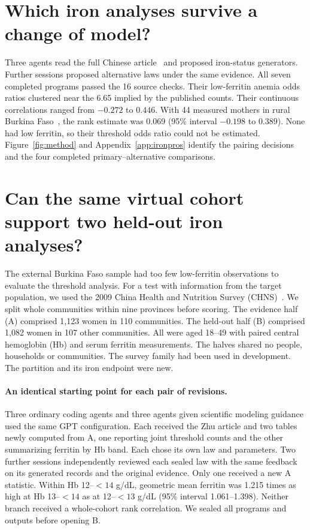 \documentclass[sigconf,anonymous,review]{acmart}
\begin{document}
\section{Which iron analyses survive a change of model?}
\label{sec:ironpros}
Three agents read the full Chinese article~\cite{zhu} and proposed iron-status generators. Further sessions proposed alternative laws under the same evidence. All seven completed programs passed the 16 source checks. Their low-ferritin anemia odds ratios clustered near the 6.65 implied by the published counts. Their continuous correlations ranged from $-0.272$ to $0.446$. With 44 measured mothers in rural Burkina Faso~\cite{burkina_iron}, the rank estimate was 0.069 (95\% interval $-0.198$ to $0.389$). None had low ferritin, so their threshold odds ratio could not be estimated. Figure~\ref{fig:method} and Appendix~\ref{app:ironpros} identify the pairing decisions and the four completed primary--alternative comparisons.

\section{Can the same virtual cohort support two held-out iron analyses?}
\label{sec:chns}
The external Burkina Faso sample had too few low-ferritin observations to evaluate the threshold analysis. For a test with information from the target population, we used the 2009 China Health and Nutrition Survey (CHNS)~\cite{chnsbio,chnsind}. We split whole communities within nine provinces before scoring. The evidence half (A) comprised 1,123 women in 110 communities. The held-out half (B) comprised 1,082 women in 107 other communities. All were aged 18--49 with paired central hemoglobin (Hb) and serum ferritin measurements. The halves shared no people, households or communities. The survey family had been used in development. The partition and its iron endpoint were new.

\paragraph{An identical starting point for each pair of revisions.}
Three ordinary coding agents and three agents given scientific modeling guidance used the same GPT configuration. Each received the Zhu article and two tables newly computed from A, one reporting joint threshold counts and the other summarizing ferritin by Hb band. Each chose its own law and parameters. Two further sessions independently reviewed each sealed law with the same feedback on its generated records and the original evidence. Only one received a new A statistic. Within Hb 12--$<14$ g/dL, geometric mean ferritin was 1.215 times as high at Hb 13--$<14$ as at 12--$<13$ g/dL (95\% interval 1.061--1.398). Neither branch received a whole-cohort rank correlation. We sealed all programs and outputs before opening B.
\end{document}

